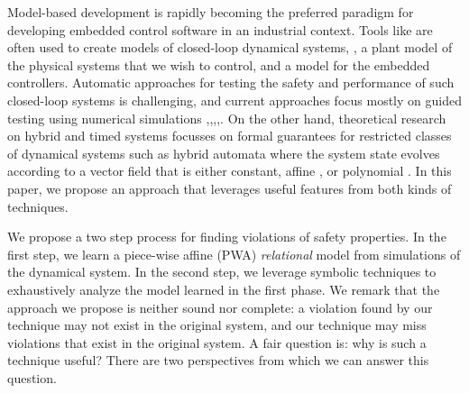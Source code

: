


Model-based development is rapidly becoming the preferred paradigm for
developing embedded control software in an industrial context.  Tools
like \SIMULINK are often used to create models of closed-loop
dynamical systems, \ie, a plant model of the physical systems that we
wish to control, and a model for the embedded controllers.  Automatic
approaches for testing the safety and performance of such closed-loop
systems is challenging, and current approaches focus mostly on guided
testing using numerical simulations
\cite{annpureddy2011s},\cite{donze2010breach},\cite{deshmukh2015stochastic},\cite{dreossi2015efficient},\cite{akazaki}.
On the other hand, theoretical research on hybrid and timed systems
focusses on formal guarantees for restricted classes of dynamical
systems such as hybrid automata where the system state evolves
according to a vector field that is either constant, affine
\cite{frehse2011spaceex}, or polynomial \cite{chen2015reachability}.
In this paper, we propose an approach that leverages useful features
from both kinds of techniques.

We propose a two step process for finding violations of safety
properties. In the first step, we learn a piece-wise affine (PWA) {\em
relational} model from simulations of the dynamical system. In the
second step, we leverage symbolic techniques to exhaustively analyze
the model learned in the first phase. We remark that the approach we
propose is neither sound nor complete: a violation found by our
technique may not exist in the original system, and our technique may
miss violations that exist in the original system. A fair question is:
why is such a technique useful? There are two perspectives from which
we can answer this question.

